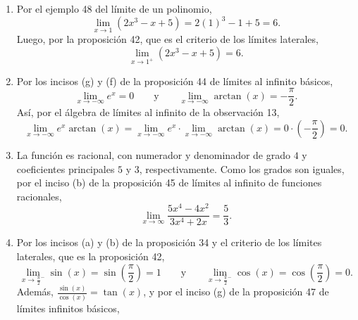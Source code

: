 \documentclass[12pt,a4paper]{article}
\begin{document}
\begin{solucion}
\begin{enumerate}
\begin{equation*}
                \lim_{x\to-5}\ln(x+6)=\ln(1)=0.
            \end{equation*}
            \item[(d)] Por el ejemplo 48 del límite de un polinomio,
            \begin{equation*}
                \lim_{x\to1}\left(2x^{3}-x+5\right)=2(1)^{3}-1+5=6.
            \end{equation*}
            Luego, por la proposición 42, que es el criterio de los límites laterales,
            \begin{equation*}
                \lim_{x\to1^{+}}\left(2x^{3}-x+5\right)=6.
            \end{equation*}
            \item[(e)] Por los incisos (g) y (f) de la proposición 44 de límites al infinito básicos,
            \begin{equation*}
                \lim_{x\to-\infty}e^{x}=0\qquad\text{y}\qquad\lim_{x\to-\infty}\arctan(x)=-\frac{\pi}{2}.
            \end{equation*}
            Así, por el álgebra de límites al infinito de la observación 13,
            \begin{equation*}
                \lim_{x\to-\infty}e^{x}\arctan(x)=\lim_{x\to-\infty}e^{x}\cdot\lim_{x\to-\infty}\arctan(x)=0\cdot\left(-\frac{\pi}{2}\right)=0.
            \end{equation*}
            \item[(f)] La función es racional, con numerador y denominador de grado $4$ y coeficientes principales $5$ y $3$, respectivamente. Como los grados son iguales, por el inciso (b) de la proposición 45 de límites al infinito de funciones racionales,
            \begin{equation*}
                \lim_{x\to\infty}\frac{5x^{4}-4x^{2}}{3x^{4}+2x}=\frac{5}{3}.
            \end{equation*}
            \item[(g)] Por los incisos (a) y (b) de la proposición 34 y el criterio de los límites laterales, que es la proposición 42,
            \begin{equation*}
                \lim_{x\to\frac{\pi}{2}^{-}}\sin(x)=\sin\left(\frac{\pi}{2}\right)=1\qquad\text{y}\qquad\lim_{x\to\frac{\pi}{2}^{-}}\cos(x)=\cos\left(\frac{\pi}{2}\right)=0.
            \end{equation*}
            Además, $\frac{\sin(x)}{\cos(x)}=\tan(x)$, y por el inciso (g) de la proposición 47 de límites infinitos básicos,
            \begin{equation*}

\end{equation*}
\end{enumerate}
\end{solucion}
\end{document}
